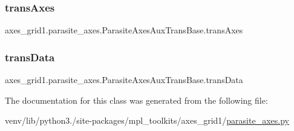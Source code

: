 \subsubsection{\texorpdfstring{trans\+Axes}{transAxes}}
{\footnotesize\ttfamily axes\+\_\+grid1.\+parasite\+\_\+axes.\+Parasite\+Axes\+Aux\+Trans\+Base.\+trans\+Axes}

\mbox{\label{classaxes__grid1_1_1parasite__axes_1_1ParasiteAxesAuxTransBase_aeccab37d54c9afa492270c3a99f210e9}} 
\subsubsection{\texorpdfstring{trans\+Data}{transData}}
{\footnotesize\ttfamily axes\+\_\+grid1.\+parasite\+\_\+axes.\+Parasite\+Axes\+Aux\+Trans\+Base.\+trans\+Data}



The documentation for this class was generated from the following file\+:\begin{DoxyCompactItemize}
\item 
venv/lib/python3./site-\/packages/mpl\+\_\+toolkits/axes\+\_\+grid1/\hyperlink{axes__grid1_2parasite__axes_8py}{parasite\+\_\+axes.\+py}\end{DoxyCompactItemize}
